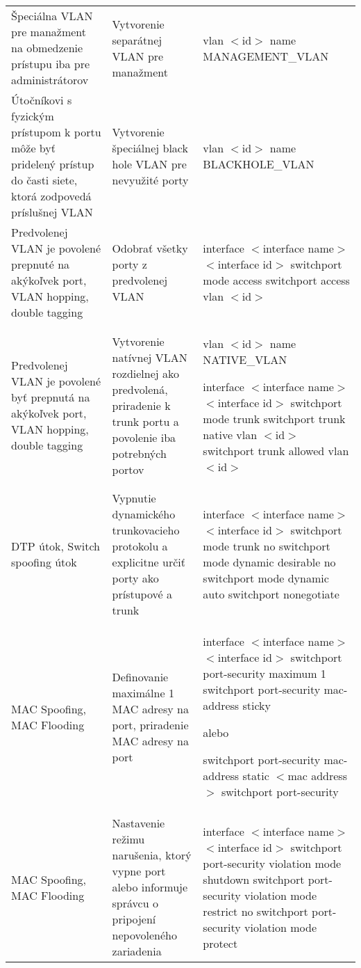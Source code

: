 \begin{longtable}[!htbp]{|L{10em}L{10em}L{34em}|}
	
	
	
	 Špeciálna VLAN pre manažment na obmedzenie prístupu iba pre administrátorov	&Vytvorenie separátnej VLAN pre manažment	&vlan $<$id$>$  
	name MANAGEMENT\_VLAN\\
	
	
	
	
	Útočníkovi s fyzickým prístupom k portu môže byť pridelený prístup do časti siete, ktorá zodpovedá príslušnej VLAN 	&Vytvorenie špeciálnej black hole VLAN pre nevyužité porty	&vlan $<$id$>$  
	name BLACKHOLE\_VLAN\\
	
	
	
	
	 Predvolenej VLAN je povolené prepnuté na akýkoľvek port, VLAN hopping, double tagging	&Odobrať všetky porty z predvolenej VLAN	&interface $<$interface name$>$ $<$interface id$>$
	switchport mode access
	switchport access vlan $<$id$>$\\
	
	
	
	
	Predvolenej VLAN je povolené byť prepnutá na akýkoľvek port, VLAN hopping, double tagging	&Vytvorenie natívnej VLAN rozdielnej ako predvolená, priradenie k trunk portu a povolenie iba potrebných portov	&vlan $<$id$>$  
	name NATIVE\_VLAN
	
	interface $<$interface name$>$ $<$interface id$>$
	switchport mode trunk
	switchport trunk native vlan $<$id$>$
	switchport trunk allowed vlan $<$id$>$\\
	
	
	
	
	 DTP útok, Switch spoofing útok	&Vypnutie dynamického trunkovacieho protokolu a explicitne určiť porty ako prístupové a trunk	&
	interface $<$interface name$>$ $<$interface id$>$
	switchport mode trunk
	no switchport mode dynamic desirable
	no switchport mode dynamic auto
	switchport nonegotiate\\
	
	
	
	MAC Spoofing, MAC Flooding 	&Definovanie maximálne 1 MAC adresy na port, priradenie MAC adresy na port	&
	interface $<$interface name$>$ $<$interface id$>$
	switchport port-security maximum 1
	switchport port-security mac-address sticky
	
	alebo
	
	switchport port-security mac-address static $<$mac address$>$
	switchport port-security\\
	MAC Spoofing, MAC Flooding 	&Nastavenie režimu narušenia, ktorý vypne port alebo informuje správcu o pripojení nepovoleného zariadenia	&interface $<$interface name$>$ $<$interface id$>$
	switchport port-security violation mode shutdown
	switchport port-security violation mode restrict
	no switchport port-security violation mode protect\\
	

\end{longtable}
